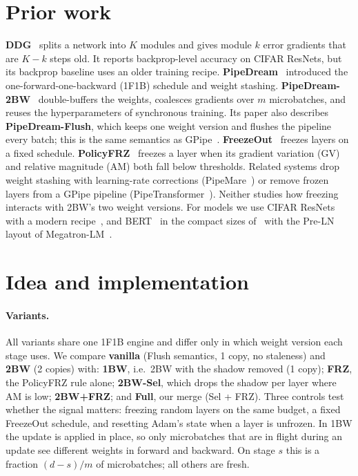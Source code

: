 \documentclass[10pt,twocolumn]{article}
\begin{document}
\section{Prior work}
\textbf{DDG}~\cite{ddg} splits a network into $K$ modules and gives module $k$ error
gradients that are $K{-}k$ steps old. It reports backprop-level accuracy on CIFAR ResNets, but
its backprop baseline uses an older training recipe.
\textbf{PipeDream}~\cite{pipedream} introduced the one-forward-one-backward (1F1B) schedule
and weight stashing. \textbf{PipeDream-2BW}~\cite{pd2bw} double-buffers the weights,
coalesces gradients over $m$ microbatches, and reuses the hyperparameters of synchronous
training. Its paper also describes \textbf{PipeDream-Flush}, which keeps one weight version and
flushes the pipeline every batch; this is the same semantics as GPipe~\cite{gpipe}.
\textbf{FreezeOut}~\cite{freezeout} freezes layers on a fixed schedule.
\textbf{PolicyFRZ}~\cite{policyfrz} freezes a layer when its gradient variation (GV) and
relative magnitude (AM) both fall below thresholds.
Related systems drop weight stashing with learning-rate corrections (PipeMare~\cite{pipemare})
or remove frozen layers from a GPipe pipeline (PipeTransformer~\cite{pipetransformer}). Neither
studies how freezing interacts with 2BW's two weight versions.
For models we use CIFAR ResNets~\cite{resnet} with a modern recipe~\cite{cifarrecipe}, and
BERT~\cite{bert} in the compact sizes of~\cite{turc} with the Pre-LN layout of
Megatron-LM~\cite{megatron}.

\section{Idea and implementation}
\paragraph{Variants.} All variants share one 1F1B engine and differ only in which weight version
each stage uses. We compare
\textbf{vanilla} (Flush semantics, 1 copy, no staleness) and \textbf{2BW} (2 copies) with:
\textbf{1BW}, i.e.\ 2BW with the shadow removed (1 copy);
\textbf{FRZ}, the PolicyFRZ rule alone;
\textbf{2BW-Sel}, which drops the shadow per layer where AM is low;
\textbf{2BW+FRZ}; and \textbf{Full}, our merge (Sel + FRZ).
Three controls test whether the signal matters: freezing random layers on the same budget, a fixed
FreezeOut schedule, and resetting Adam's state when a layer is unfrozen.
In 1BW the update is applied in place, so only microbatches that are in flight during an update
see different weights in forward and backward. On stage $s$ this is a fraction $(d{-}s)/m$ of
microbatches; all others are fresh.
\end{document}
